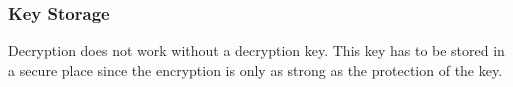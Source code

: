 \subsubsection{Key Storage} \label{section:counter-replace-encryption-key-online}
Decryption does not work without a decryption key.
This key has to be stored in a secure place since the encryption is only as strong as the protection of the key.
